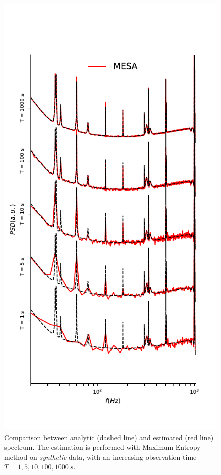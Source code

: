 \documentclass[twocolumn,showpacs,preprintnumbers,nofootinbib,prd,
superscriptaddress,10pt]{revtex4-1}
\begin{document}
\begin{figure}

\begin{minipage}{0.99\columnwidth}
	\caption{Comparison between analytic (dashed line) and estimated (red line) spectrum. The estimation is performed with Maximum Entropy method on \textit{synthetic} data, with an increasing observation time $T = 1, 5, 10, 100, \SI{1000}{s}$.}
	\label{fig:MESA_LIGO_data}
	\includegraphics{Images/comparison_LVC_data/comparison_LVC_data_MESA.pdf}

\end{minipage}
\end{figure}
\end{document}
